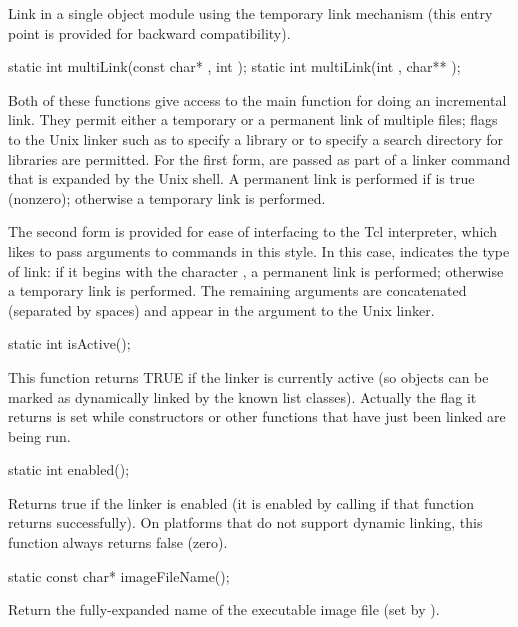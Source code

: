 Link in a single object module using the temporary link mechanism
(this entry point is provided for backward compatibility).

\begin{example}
static int multiLink(const char* , int );
static int multiLink(int , char** );
\end{example}

Both of these functions give access to the main function for doing
an incremental link.  They permit either a temporary or a permanent
link of multiple files; flags to the Unix linker such as 
to specify a library or  to specify a search directory for
libraries are permitted.  For the first form,  are passed
as part of a linker command that is expanded by the Unix shell.  A
permanent link is performed if  is true (nonzero);
otherwise a temporary link is performed.

The second form is provided for ease of interfacing to the Tcl
interpreter, which likes to pass arguments to commands in this
style.  In this case,  indicates the type of
link: if it begins with the character , a permanent link
is performed; otherwise a temporary link is performed.  The remaining
arguments are concatenated (separated by spaces) and appear in the
argument to the Unix linker.

\begin{example}
static int isActive();
\end{example}

This function returns TRUE if the linker is currently active (so objects
can be marked as dynamically linked by the known list classes).
Actually the flag it returns is set while constructors or other
functions that have just been linked are being run.

\begin{example}
static int enabled();
\end{example}

Returns true if the linker is enabled (it is enabled by calling
 if that function returns successfully).  On
platforms that do not support dynamic linking, this function
always returns false (zero).

\begin{example}
static const char* imageFileName();
\end{example}

Return the fully-expanded name of the executable image file (set by
).

